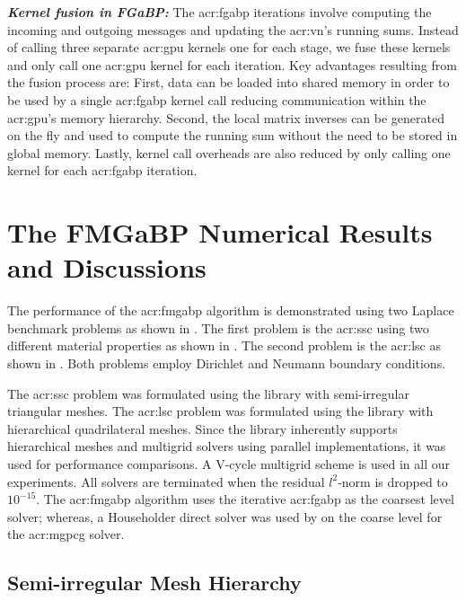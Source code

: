 \textbf{\textsl{Kernel fusion in FGaBP:}} The \gls{acr:fgabp} iterations involve computing the incoming and outgoing messages and updating the \gls{acr:vn}'s running sums.
Instead of calling three separate \gls{acr:gpu} kernels one for each stage, we fuse these kernels and only call one \gls{acr:gpu} kernel for each iteration.
Key advantages resulting from the fusion process are:
First, data can be loaded into shared memory in order to be used by a single \gls{acr:fgabp} kernel call reducing communication within the \gls{acr:gpu}'s memory hierarchy.
Second, the local matrix inverses can be generated on the fly and used to compute the running sum without the need to be stored in global memory.
Lastly, kernel call overheads are also reduced by only calling one kernel for each \gls{acr:fgabp} iteration.


\section{The FMGaBP Numerical Results and Discussions}
\label{sec:FMGaBP_res}

The performance of the \gls{acr:fmgabp} algorithm is demonstrated using two Laplace benchmark problems as shown in .
The first problem is the \gls{acr:ssc} using two different material properties as shown in .
The second problem is the \gls{acr:lsc} as shown in .
Both problems employ Dirichlet and Neumann boundary conditions.


The \gls{acr:ssc} problem was formulated using the library  \cite{bib:getfem} with semi-irregular triangular meshes.
The \gls{acr:lsc} problem was formulated using the library  \cite{bib:dealii2007} with hierarchical quadrilateral meshes.
Since the library  inherently supports hierarchical meshes and multigrid solvers using parallel implementations, it was used for performance comparisons.
A V-cycle multigrid scheme is used in all our experiments.
All solvers are terminated when the residual $l^2$-norm is dropped to $10^{-15}$.
The \gls{acr:fmgabp} algorithm uses the iterative \gls{acr:fgabp} as the coarsest level solver; whereas, a Householder direct solver was used by  on the coarse level for the \gls{acr:mgpcg} solver.


\subsection{Semi-irregular Mesh Hierarchy}

